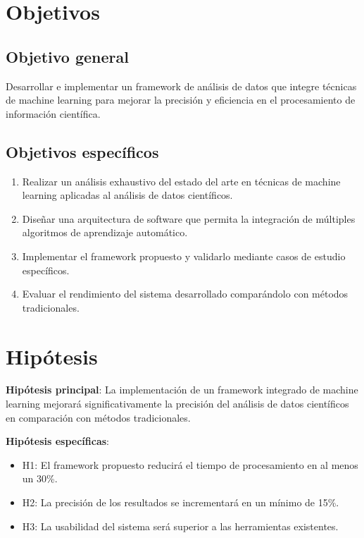 \section{Objetivos}

\subsection{Objetivo general}

Desarrollar e implementar un framework de análisis de datos que integre técnicas de machine learning para mejorar la precisión y eficiencia en el procesamiento de información científica.

\subsection{Objetivos específicos}

\begin{enumerate}
    \item Realizar un análisis exhaustivo del estado del arte en técnicas de machine learning aplicadas al análisis de datos científicos.
    \item Diseñar una arquitectura de software que permita la integración de múltiples algoritmos de aprendizaje automático.
    \item Implementar el framework propuesto y validarlo mediante casos de estudio específicos.
    \item Evaluar el rendimiento del sistema desarrollado comparándolo con métodos tradicionales.
\end{enumerate}

\section{Hipótesis}

\textbf{Hipótesis principal}: La implementación de un framework integrado de machine learning mejorará significativamente la precisión del análisis de datos científicos en comparación con métodos tradicionales.

\textbf{Hipótesis específicas}:
\begin{itemize}
    \item H1: El framework propuesto reducirá el tiempo de procesamiento en al menos un 30\%.
    \item H2: La precisión de los resultados se incrementará en un mínimo de 15\%.
    \item H3: La usabilidad del sistema será superior a las herramientas existentes.
\end{itemize}

